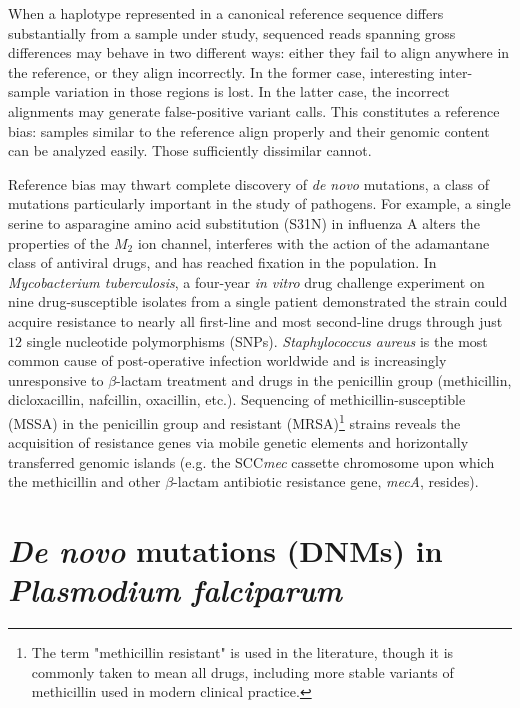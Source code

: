 When a haplotype represented in a canonical reference sequence differs substantially from a sample under study, sequenced reads spanning gross differences may behave in two different ways: either they fail to align anywhere in the reference, or they align incorrectly.  In the former case, interesting inter-sample variation in those regions is lost.  In the latter case, the incorrect alignments may generate false-positive variant calls.  This constitutes a reference bias: samples similar to the reference align properly and their genomic content can be analyzed easily.  Those sufficiently dissimilar cannot.

Reference bias may thwart complete discovery of \textit{de novo} mutations, a class of mutations particularly important in the study of pathogens.  For example, a single serine to asparagine amino acid substitution (S31N) in influenza A alters the properties of the $M_2$ ion channel\cite{Wang:1993uc}, interferes with the action of the adamantane class of antiviral drugs, and has reached fixation in the population\cite{Nelson:2009en}.  In \textit{Mycobacterium tuberculosis}, a four-year \textit{in vitro} drug challenge experiment on nine drug-susceptible isolates from a single patient demonstrated the strain could acquire resistance to nearly all first-line and most second-line drugs through just $12$ single nucleotide polymorphisms (SNPs)\cite{Eldholm:2014ei}.  \textit{Staphylococcus aureus} is the most common cause of post-operative infection worldwide and is increasingly unresponsive to $\beta$-lactam treatment and drugs in the penicillin group (methicillin, dicloxacillin, nafcillin, oxacillin, etc.).  Sequencing of methicillin-susceptible (MSSA) in the penicillin group and resistant (MRSA)\footnote{The term "methicillin resistant" is used in the literature, though it is commonly taken to mean all drugs, including more stable variants of methicillin used in modern clinical practice.} strains reveals the acquisition of resistance genes via mobile genetic elements and horizontally transferred genomic islands (e.g. the SCC\textit{mec} cassette chromosome upon which the methicillin and other $\beta$-lactam antibiotic resistance gene, \textit{mecA}, resides)\cite{Holden:2004kd}.

\section{\textit{De novo} mutations (DNMs) in \textit{Plasmodium falciparum}}

